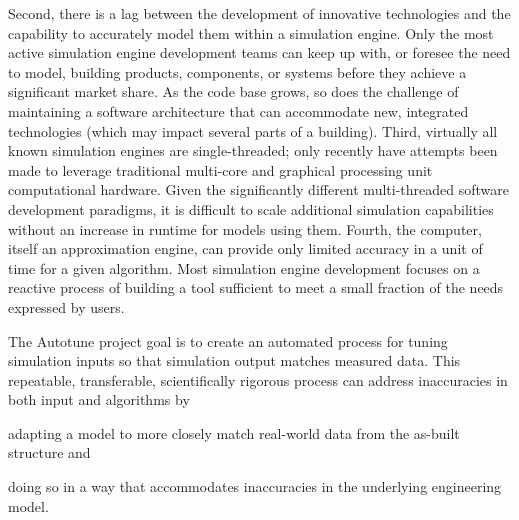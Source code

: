 \documentclass[preprint, review, 12pt]{elsarticle}
\begin{document}
Second, there is a lag between the development of innovative technologies and the capability to accurately model them within a simulation engine. Only the most active simulation engine development teams can keep up with, or foresee the need to model, building products, components, or systems before they achieve a significant market share. As the code base grows, so does the challenge of maintaining a software architecture that can accommodate new, integrated technologies (which may impact several parts of a building). Third, virtually all known simulation engines are single-threaded; only recently have attempts been made to leverage traditional multi-core and graphical processing unit computational hardware. Given the significantly different multi-threaded software development paradigms, it is difficult to scale additional simulation capabilities without an increase in runtime for models using them. Fourth, the computer, itself an approximation engine, can provide only limited accuracy in a unit of time for a given algorithm. Most simulation engine development focuses on a reactive process of building a tool sufficient to meet a small fraction of the needs expressed by users.

The Autotune project \cite{cit:new2012} goal is to create an automated process for tuning simulation inputs so that simulation output matches measured data. This repeatable, transferable, scientifically rigorous process can address inaccuracies in both input and algorithms by 
\begin{inparaenum}[(1)]
\item adapting a model to more closely match real-world data from the as-built structure and 
\item doing so in a way that accommodates inaccuracies in the underlying engineering
model. %
\end{inparaenum}
\end{document}
